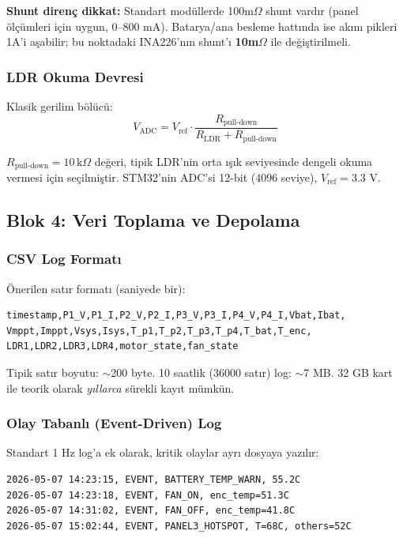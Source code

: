 \documentclass[11pt,a4paper]{article}
\begin{document}
\textbf{Shunt direnç dikkat:} Standart modüllerde 100m$\Omega$ shunt vardır (panel ölçümleri için uygun, 0--800 mA). Batarya/ana besleme hattında ise akım pikleri 1A'i aşabilir; bu noktadaki INA226'nın shunt'ı \textbf{10m$\Omega$} ile değiştirilmeli.

\subsubsection{LDR Okuma Devresi}

Klasik gerilim bölücü:
\begin{equation}
V_{\text{ADC}} = V_{\text{ref}} \cdot \frac{R_{\text{pull-down}}}{R_{\text{LDR}} + R_{\text{pull-down}}}
\end{equation}

$R_{\text{pull-down}} = 10\,\text{k}\Omega$ değeri, tipik LDR'nin orta ışık seviyesinde dengeli okuma vermesi için seçilmiştir. STM32'nin ADC'si 12-bit (4096 seviye), $V_{\text{ref}} = 3.3$ V.

\subsection{Blok 4: Veri Toplama ve Depolama}

\subsubsection{CSV Log Formatı}

Önerilen satır formatı (saniyede bir):

\begin{lstlisting}
timestamp,P1_V,P1_I,P2_V,P2_I,P3_V,P3_I,P4_V,P4_I,Vbat,Ibat,
Vmppt,Imppt,Vsys,Isys,T_p1,T_p2,T_p3,T_p4,T_bat,T_enc,
LDR1,LDR2,LDR3,LDR4,motor_state,fan_state
\end{lstlisting}

Tipik satır boyutu: $\sim$200 byte. 10 saatlik (36000 satır) log: $\sim$7 MB. 32 GB kart ile teorik olarak \textit{yıllarca} sürekli kayıt mümkün.

\subsubsection{Olay Tabanlı (Event-Driven) Log}

Standart 1 Hz log'a ek olarak, kritik olaylar ayrı dosyaya yazılır:

\begin{lstlisting}
2026-05-07 14:23:15, EVENT, BATTERY_TEMP_WARN, 55.2C
2026-05-07 14:23:18, EVENT, FAN_ON, enc_temp=51.3C
2026-05-07 14:31:02, EVENT, FAN_OFF, enc_temp=41.8C
2026-05-07 15:02:44, EVENT, PANEL3_HOTSPOT, T=68C, others=52C
\end{lstlisting}
\end{document}
